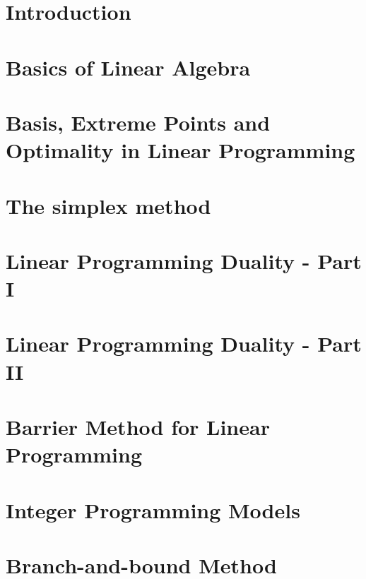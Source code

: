 \documentclass{bookest}
\begin{document}
	

	\tableofcontents
	
	\chapter{Introduction} \label{chapter_1}
	
	
	\chapter{Basics of Linear Algebra} \label{chapter_2}
	
	
	\chapter{Basis, Extreme Points and Optimality in Linear Programming} \label{chapter_3}
		 
	
	\chapter{The simplex method} \label{chapter_4}
		
		
	\chapter{Linear Programming Duality - Part I} \label{chapter_5}
		
	
	\chapter{Linear Programming Duality - Part II} \label{chapter_6}
	
	
	\chapter{Barrier Method for Linear Programming} \label{chapter_7}
	
	
	\chapter{Integer Programming Models} \label{chapter_8}
	
	
	\chapter{Branch-and-bound Method} \label{chapter_9}
	
	
\end{document}
